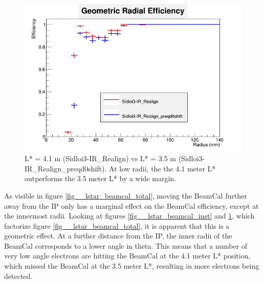 \documentclass{report}
\begin{document}
                \begin{figure}[H]
                    \includegraphics[height=.4\textheight]{RadialEfficiencyFP_geometric}
                    \centering
                    \caption{L* = 4.1 m (Sidloi3-IR\_Realign) vs L* = 3.5 m (Sidloi3-IR\_Realign\_preqd0shift). At low radii, the the 4.1 meter L* outperforms the 3.5 meter L* by a wide margin. }
                    \label{fig__lstar_beamcal_geom}
                \end{figure}

                As visible in figure \ref{fig__lstar_beamcal_total}, moving the BeamCal further away from the IP only has a marginal effect on the BeamCal efficiency, except at the innermost radii. Looking at figures \ref{fig__lstar_beamcal_inst} and \ref{fig__lstar_beamcal_geom}, which factorize figure \ref{fig__lstar_beamcal_total}, it is apparent that this is a geometric effect. At a further distance from the IP, the inner radii of the BeamCal corresponds to a lower angle in theta. This means that a number of very low angle electrons are hitting the BeamCal at the 4.1 meter L* position, which missed the BeamCal at the 3.5 meter L*, resulting in more electrons being detected.
                    
\end{document}
